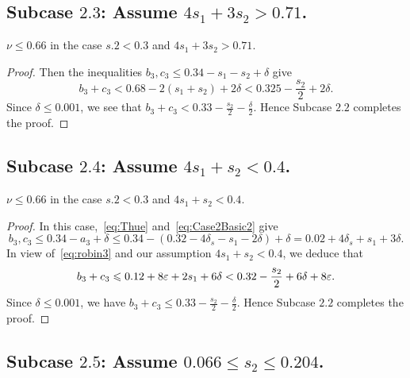 \subsection*{Subcase $\mathbf{2.3}$: Assume $4s_1+3s_2>0.71$.}

\begin{lemma}\label{lem:Subcase2.3}
  \leanok
  $\nu \leq 0.66$ in the case $s.2 < 0.3$ and $4s_1+3s_2>0.71$.
\end{lemma}
\begin{proof}
  \leanok
  Then the inequalities $b_3,c_3 \le 0.34-s_1-s_2+ \delta$ give
  \[
  b_3+c_3<0.68-2(s_1+s_2)+2\delta<
  0.325 -\frac{s_2}{2}+2\delta.
  \]
  Since $\delta\leq 0.001$, we see that $b_3+c_3<0.33-\frac{s_2}{2}-\frac{\delta}{2}$.
  Hence Subcase $\mathbf{2.2}$ completes the proof.
\end{proof}

\subsection*{Subcase $\mathbf{2.4}$: Assume $4s_1+s_2<0.4$.}

\begin{lemma}\label{lem:Subcase2.4}
  \leanok
  $\nu \leq 0.66$ in the case $s.2 < 0.3$ and $4s_1+s_2<0.4$.
\end{lemma}
\begin{proof}
  \leanok
  In this case,~\eqref{eq:Thue} and~\eqref{eq:Case2Basic2} give
  \[
  b_3,c_3 \le 0.34-a_3+\delta \le 0.34 - (0.32-4\delta_s-s_1-2\delta) +\delta= 0.02+4\delta_s+s_1+3\delta.
  \]
  In view of~\eqref{eq:robin3} and
  our assumption $4s_1+s_2<0.4$, we deduce that
  \begin{align*}
    b_3+c_3 \leqslant 0.12+8\varepsilon + 2s_1+6\delta <
    0.32-\frac{s_2}{2}+6\delta+8\varepsilon.
  \end{align*}
  Since $\delta\leq 0.001$, we have $b_3+c_3 \le 0.33-\frac{s_2}{2}-\frac{\delta}{2}$. Hence
  Subcase $\mathbf{2.2}$ completes the proof.
\end{proof}


\subsection*{Subcase $\mathbf{2.5}$: Assume $0.066\leq s_2\leq
0.204$.}

